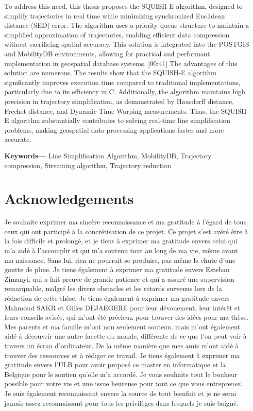 \documentclass[twoside,12pt, a4paper]{report}
\providecommand{\keywords}[1]
{
  
  \textbf{Keywords---} #1
}
\begin{document}
To address this need, this thesis proposes the SQUISH-E algorithm, designed to simplify trajectories in real time while minimizing synchronized Euclidean distance (SED) error. The algorithm uses a priority queue structure to maintain a simplified approximation of trajectories, enabling efficient data compression without sacrificing spatial accuracy. This solution is integrated into the POSTGIS and MobilityDB environments, allowing for practical and performant implementation in geospatial database systems.
[00:41]
The advantages of this solution are numerous. The results show that the SQUISH-E algorithm significantly improves execution time compared to traditional implementations, particularly due to its efficiency in C. Additionally, the algorithm maintains high precision in trajectory simplification, as demonstrated by Hausdorff distance, Frechet distance, and Dynamic Time Warping measurements. Thus, the SQUISH-E algorithm substantially contributes to solving real-time line simplification problems, making geospatial data processing applications faster and more accurate.


\vspace{10pt}

\keywords{Line Simplification Algorithm, MobilityDB, Trajectory compression, Streaming algorithm, Trajectory reduction}

\newpage

\section*{Acknowledgements}
Je souhaite exprimer ma sincère reconnaissance et ma gratitude à l'égard de tous ceux qui ont participé à la concrétisation de ce projet. Ce projet s'est avéré être à la fois difficile et prolongé, et je tiens à exprimer ma gratitude envers celui qui m'a aidé à l'accomplir et qui m'a soutenu tout au long de ma vie, même avant ma naissance. Sans lui, rien ne pourrait se produire, pas même la chute d'une goutte de pluie. Je tiens également à exprimer ma gratitude envers Esteban Zimanyi, qui a fait preuve de grande patience et qui a assuré une supervision remarquable, malgré les divers obstacles et les retards survenus lors de la rédaction de cette thèse. Je tiens également à exprimer ma gratitude envers Mahmoud SAKR et Gilles DEJAEGERE pour leur dévouement, leur intérêt et leurs conseils avisés, qui m'ont été précieux pour trouver des idées pour ma thèse. Mes parents et ma famille m'ont non seulement soutenu, mais m'ont également aidé à découvrir une autre facette du monde, différente de ce que l'on peut voir à travers un écran d'ordinateur. De la même manière que mes amis m'ont aidé à trouver des ressources et à rédiger ce travail. Je tiens également à exprimer ma gratitude envers l'ULB pour avoir proposé ce master en informatique et la Belgique pour le soutien qu'elle m'a accordé. Je vous souhaite tout le bonheur possible pour votre vie et une issue heureuse pour tout ce que vous entreprenez. Je suis également reconnaissant envers la source de tout bienfait et je ne serai jamais assez reconnaissant pour tous les privilèges dans lesquels je suis baigné. 
\newpage
\end{document}
